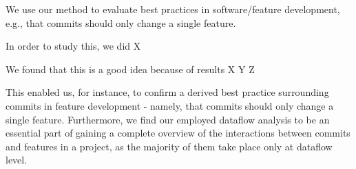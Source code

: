 We use our method to evaluate best practices in software/feature development, e.g., that commits should only change a single feature.

In order to study this, we did X

We found that this is a good idea because of results X Y Z

This enabled us, for instance, to confirm a derived best practice surrounding commits in feature development - namely, that commits should only change a single feature.
Furthermore, we find our employed dataflow analysis to be an essential part of gaining a complete overview of the interactions between commits and features in a project, as the majority of them take place only at dataflow level.




\fi 

\vfill

\endgroup

\vfill
